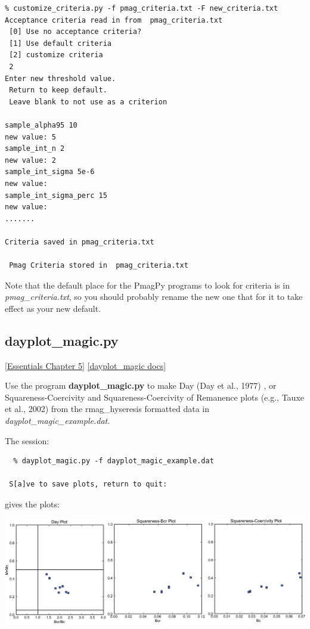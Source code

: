 \documentclass[11pt]{book}
\begin{document}
{{\begin{verbatim}
% customize_criteria.py -f pmag_criteria.txt -F new_criteria.txt
Acceptance criteria read in from  pmag_criteria.txt
 [0] Use no acceptance criteria?
 [1] Use default criteria
 [2] customize criteria
 2
Enter new threshold value.
 Return to keep default.
 Leave blank to not use as a criterion

sample_alpha95 10
new value: 5
sample_int_n 2
new value: 2
sample_int_sigma 5e-6
new value:
sample_int_sigma_perc 15
new value:
.......

Criteria saved in pmag_criteria.txt

 Pmag Criteria stored in  pmag_criteria.txt

\end{verbatim}

Note that the default place for the PmagPy programs to look for criteria is in {\it pmag\_criteria.txt}, so you should probably rename the new one that for it to take effect as your new default.

%

\subsection{dayplot\_magic.py}
\href{http://earthref.org/MAGIC/books/Tauxe/Essentials/WebBook3ch5.html#ch5}{[Essentials Chapter 5]}
\href{https://github.com/PmagPy/PmagPy/blob/master/programs/dayplot_magic.py}{[dayplot\_magic docs]}

 Use the program {\bf dayplot\_magic.py}  to make Day (Day et al., 1977) \nocite{day77}, or Squareness-Coercivity and Squareness-Coercivity of Remanence plots (e.g., Tauxe et al., 2002) \nocite{tauxe02} from the rmag\_hyseresis formatted data in {\it dayplot\_magic\_example.dat.}

 The session:

  \begin{verbatim}
  % dayplot_magic.py -f dayplot_magic_example.dat

 S[a]ve to save plots, return to quit:
\end{verbatim}



\noindent gives the plots:

{%
  \includegraphics[width=15cm]{EPSfiles/dayplot.eps}}



}}
\end{document}
